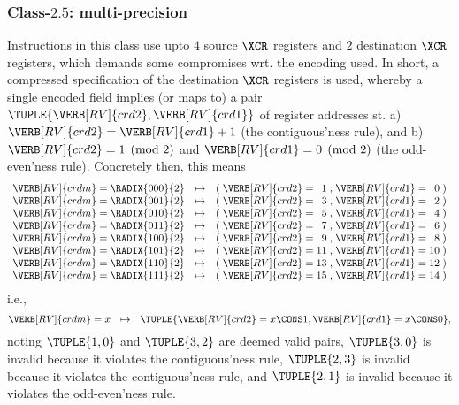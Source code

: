 
\subsubsection{Class-$2.5$: multi-precision}
\label{sec:spec:instruction:2:5}

Instructions in this class use upto
$4$ source      $\XCR$ registers
and
$2$ destination $\XCR$ registers,
which demands some compromises wrt. the encoding used.
In short, a compressed specification of the destination $\XCR$ registers is
used, whereby a single encoded  field implies (or maps to) a 
pair 
$
\TUPLE{ \VERB[RV]{crd2}, \VERB[RV]{crd1} }
$
of register addresses st.
a) $\VERB[RV]{crd2} = \VERB[RV]{crd1} + 1$
   (the contiguous'ness rule),
   and
b) $\VERB[RV]{crd2} = 1 \pmod{2}$
   and 
   $\VERB[RV]{crd1} = 0 \pmod{2}$
   (the  odd-even'ness rule).
Concretely then, this means
\[
\begin{array}{l@{\;}c@{\;}r c c@{\;}l@{\;}c@{\;}r@{\;}c@{\;}l@{\;}c@{\;}r@{\;}c}
\VERB[RV]{crdm} &=& \RADIX{000}{2} &\mapsto& ( & \VERB[RV]{crd2} &=&  1 &,& \VERB[RV]{crd1} &=&  0 & ) \\
\VERB[RV]{crdm} &=& \RADIX{001}{2} &\mapsto& ( & \VERB[RV]{crd2} &=&  3 &,& \VERB[RV]{crd1} &=&  2 & ) \\
\VERB[RV]{crdm} &=& \RADIX{010}{2} &\mapsto& ( & \VERB[RV]{crd2} &=&  5 &,& \VERB[RV]{crd1} &=&  4 & ) \\
\VERB[RV]{crdm} &=& \RADIX{011}{2} &\mapsto& ( & \VERB[RV]{crd2} &=&  7 &,& \VERB[RV]{crd1} &=&  6 & ) \\
\VERB[RV]{crdm} &=& \RADIX{100}{2} &\mapsto& ( & \VERB[RV]{crd2} &=&  9 &,& \VERB[RV]{crd1} &=&  8 & ) \\
\VERB[RV]{crdm} &=& \RADIX{101}{2} &\mapsto& ( & \VERB[RV]{crd2} &=& 11 &,& \VERB[RV]{crd1} &=& 10 & ) \\
\VERB[RV]{crdm} &=& \RADIX{110}{2} &\mapsto& ( & \VERB[RV]{crd2} &=& 13 &,& \VERB[RV]{crd1} &=& 12 & ) \\
\VERB[RV]{crdm} &=& \RADIX{111}{2} &\mapsto& ( & \VERB[RV]{crd2} &=& 15 &,& \VERB[RV]{crd1} &=& 14 & ) \\
\end{array}
\]
i.e.,
\[
\VERB[RV]{crdm} = x ~~\mapsto~~ \TUPLE{ \VERB[RV]{crd2} = x \CONS 1 , \VERB[RV]{crd1} = x \CONS 0 } ,
\]
noting
$\TUPLE{ 1, 0 }$ and $\TUPLE{ 3, 2 }$ are deemed valid pairs,
$\TUPLE{ 3, 0 }$ is invalid because it violates the contiguous'ness rule,
$\TUPLE{ 2, 3 }$ is invalid because it violates the contiguous'ness rule,
and
$\TUPLE{ 2, 1 }$ is invalid because it violates the  odd-even'ness rule.

